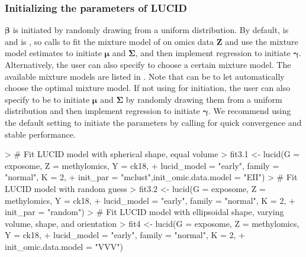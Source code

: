 \subsubsection{Initializing the parameters of LUCID} \label{sec3.1.1}
$\bm \beta$ is initiated by randomly drawing from a uniform distribution. By default,  is  and  is , so  calls  to fit the mixture model of  on omics data $\bm Z$ and use the mixture model estimates to initiate $\bm \mu$ and $\bm \Sigma$, and then implement regression to initiate $\bm \gamma$. Alternatively, the user can also specify  to choose a certain mixture model. The available mixture models are listed in  \citep{scrucca2016mclust}. Note that  can be  to let  automatically choose the optimal mixture model. If not using  for initiation, the user can also specify  to be  to initiate $\bm \mu$ and $\bm \Sigma$ by randomly drawing them from a uniform distribution and then implement regression to initiate $\bm \gamma$. We recommend using the default setting to initiate the parameters by calling  for quick convergence and stable performance.

\begin{example}
> # Fit LUCID model with spherical shape, equal volume
> fit3.1 <- lucid(G = exposome, Z = methylomics, Y = ck18, 
+                 lucid_model = "early", family = "normal", K = 2,
+                 init_par = "mclust",init_omic.data.model = "EII")
> # Fit LUCID model with random guess
> fit3.2 <- lucid(G = exposome, Z = methylomics, Y = ck18, 
+                 lucid_model = "early", family = "normal", K = 2,
+                 init_par = "random")
> # Fit LUCID model with ellipsoidal shape, varying volume, shape, and orientation 
> fit4 <- lucid(G = exposome, Z = methylomics, Y = ck18, 
+               lucid_model = "early", family = "normal", K = 2,
+               init_omic.data.model = "VVV")

\end{example}

